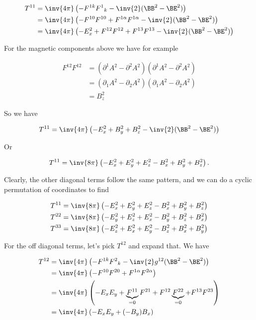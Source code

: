 \begin{align*}
T^{1 1} 
&= \inv{4 \pi} \left( - F^{1 k} {F^1}_k - \inv{2} (\BB^2 - \BE^2) \right) \\
&= \inv{4 \pi} \left( - F^{1 0} F^{1 0} + F^{1 \alpha} F^{1 \alpha} - \inv{2} (\BB^2 - \BE^2) \right) \\
&= \inv{4 \pi} \left( 
- E_x^2
+ F^{1 2} F^{1 2}
+ F^{1 3} F^{1 3}
 - \inv{2} (\BB^2 - \BE^2) \right) \\
\end{align*}

For the magnetic components above we have for example

\begin{align*}
F^{1 2} F^{1 2} 
&=
(\partial^1 A^2 - \partial^2 A^2) (\partial^1 A^2 - \partial^2 A^2) \\
&=
(\partial_1 A^2 - \partial_2 A^2) (\partial_1 A^2 - \partial_2 A^2) \\
&=
B_z^2
\end{align*}

So we have

\begin{equation}\label{eqn:relativisticElectrodynamicsPS6:240}
T^{1 1} 
= \inv{4 \pi} \left( 
- E_x^2 + B_y^2 + B_z^2
- \inv{2} (\BB^2 - \BE^2) \right)
\end{equation}

Or

\begin{equation}\label{eqn:relativisticElectrodynamicsPS6:260}
T^{1 1} 
= \inv{8 \pi} \left( 
- E_x^2 + E_y^2 + E_z^2
- B_x^2 + B_y^2 + B_z^2
\right).
\end{equation}

Clearly, the other diagonal terms follow the same pattern, and we can do a cyclic permutation of coordinates to find

\begin{align}\label{eqn:relativisticElectrodynamicsPS6:280}
T^{1 1} &= \inv{8 \pi} \left( - E_x^2 + E_y^2 + E_z^2 - B_x^2 + B_y^2 + B_z^2 \right) \\
T^{2 2} &= \inv{8 \pi} \left( - E_y^2 + E_z^2 + E_x^2 - B_y^2 + B_z^2 + B_x^2 \right) \\
T^{3 3} &= \inv{8 \pi} \left( - E_z^2 + E_x^2 + E_y^2 - B_z^2 + B_x^2 + B_y^2 \right) 
\end{align}

For the off diagonal terms, let's pick $T^{1 2}$ and expand that.  We have

\begin{align*}
T^{1 2} 
&= \inv{4 \pi} \left( - F^{1 k} {F^2}_k - \inv{2} g^{1 2}(\BB^2 - \BE^2) \right) \\
&= \inv{4 \pi} \left( - F^{1 0} F^{2 0} + F^{1 \alpha} F^{2 \alpha} \right) \\
&= \inv{4 \pi} \left( - E_x E_y 
+ \underbrace{F^{1 1}}_{=0} F^{2 1} 
+ F^{1 2} \underbrace{F^{2 2}}_{=0}
+ F^{1 3} F^{2 3} 
\right) \\
&= \inv{4 \pi} \left( - E_x E_y + (-B_y) B_x \right) \\
\end{align*}

